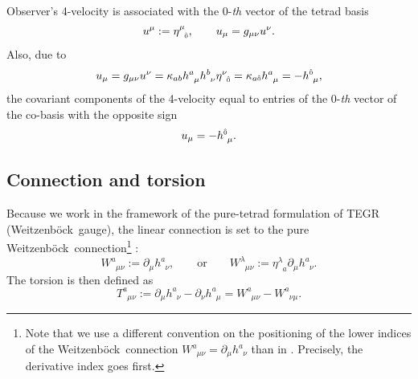\documentclass[
10pt, %
a4paper, %
oneside, %
twocolumn,
headinclude,footinclude, %
BCOR5mm, %
]{scrartcl}
\newcommand{\pd}[1]{\partial_{#1}}
\newcommand{\mg}[1]{\kappa_{#1}}			%
\newcommand{\tetrsymbol}{h}
\newcommand{\itetrsymbol}{\eta}
\newcommand{\itetr}[2]{\itetrsymbol^{#1}_{\phantom{#1}#2}}
\newcommand{\tetr}[2]{\tetrsymbol^{#1}_{\phantom{#1}#2}}
\newcommand{\D}[1]{\partial_{#1}} %
\newcommand{\Tors}[2]{T^{#1}_{\phantom{#1}#2}}
\newcommand{\w}[2]{W^{#1}_{\phantom{#1}#2}}
\newcommand{\We}{Weitzenb\"ock}
\newcommand{\KD}[2]{\delta^{#1}_{\ #2}}
\newcommand{\indalg}[1]{\hat{\mathsmaller{#1}}}
\begin{document}
	Observer's 4-velocity is associated with the $ 0 $-\textit{th} vector of the tetrad basis 
	\begin{equation}\label{eqn.4v}
		u^\mu := \itetr{\mu}{\indalg{0}}, \qquad u_\mu = g_{\mu\nu}u^\nu.
	\end{equation}
	Also, due to
	\begin{equation}
		u_\mu = g_{\mu\nu} u^\nu = \mg{ab}\tetr{a}{\mu}\tetr{b}{\nu}\itetr{\nu}{\indalg{0}} = 
		\mg{a\indalg{0}}\tetr{a}{\mu} = -\tetr{\indalg{0}}{\mu},
	\end{equation}\label{eqn.4v.cov}
	the covariant components of the 4-velocity equal to entries of the $ 0 $-\textit{th} vector of 
	the 
	co-basis with the opposite sign
	\begin{equation}
		u_\mu = -\tetr{\indalg{0}}{\mu}.
	\end{equation}
	
	
	
	
	\subsection{Connection and torsion}
	
	Because we work in the framework of the pure-tetrad formulation of TEGR
	(\We\ gauge), the linear connection is set to the pure \We\
	connection\footnote{Note that we use a different convention on the
	positioning of the lower indices of the \We\ connection $ \w{a}{\mu\nu} =
	\pd{\mu}\tetr{a}{\nu} $ than in \cite{AldrovandiPereiraBook}. Precisely, the
	derivative index goes first.}
	\cite{AldrovandiPereiraBook,KleinertMultivalued}: 
	\begin{equation}\label{eqn.We}
		\w{a}{\mu\nu} := \pd{\mu}\tetr{a}{\nu}, 
		\qquad
		\text{or}
		\qquad
		\w{\lambda}{\mu\nu} := \itetr{\lambda}{a}\pd{\mu}\tetr{a}{\nu}.
	\end{equation}
	The torsion is then defined as
	\begin{equation}\label{eqn.def.tors}
		\Tors{a}{\mu\nu}:=\D{\mu}\tetr{a}{\nu} - \D{\nu}\tetr{a}{\mu} = 
		\w{a}{\mu\nu} - \w{a}{\nu\mu}.
	\end{equation}
	
\end{document}
